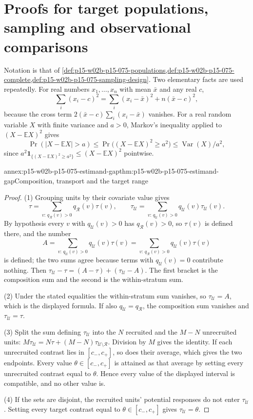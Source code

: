 \section{Proofs for target populations, sampling and observational comparisons}
\label{sec:annex-p15-w02b-p15-075}

Notation is that of
\cref{def:p15-w02b-p15-075-populations,def:p15-w02b-p15-075-complete,def:p15-w02b-p15-075-sampling-design}.
Two elementary facts are used repeatedly. For real numbers \(x_1,\ldots,x_n\)
with mean \(\bar x\) and any real \(c\),
\[
 \sum_i(x_i-c)^2=\sum_i(x_i-\bar x)^2+n(\bar x-c)^2, \tag{A}
\]
because the cross term \(2(\bar x-c)\sum_i(x_i-\bar x)\) vanishes. For a real
random variable \(X\) with finite variance and \(a>0\), Markov's inequality
applied to \((X-\mathbb EX)^2\) gives
\[
 \Pr(|X-\mathbb EX|>a)\leq\Pr\bigl((X-\mathbb EX)^2\geq a^2\bigr)
 \leq\operatorname{Var}(X)/a^2, \tag{B}
\]
since \(a^2\mathbf1_{\{(X-\mathbb EX)^2\geq a^2\}}\leq(X-\mathbb EX)^2\)
pointwise.

\begin{annexitem}{annex:p15-w02b-p15-075-estimand-gap}{thm:p15-w02b-p15-075-estimand-gap}{Composition, transport and the target range}
\begin{proof}
(1) Grouping units by their covariate value gives
\[
 \tau=\sum_{v:\,q_{\mathcal R}(v)>0}q_{\mathcal R}(v)\tau(v),\qquad
 \tau_{\mathcal U}=\sum_{v:\,q_{\mathcal U}(v)>0}q_{\mathcal U}(v)\tau_{\mathcal U}(v).
\]
By hypothesis every \(v\) with \(q_{\mathcal U}(v)>0\) has
\(q_{\mathcal R}(v)>0\), so \(\tau(v)\) is defined there, and the number
\[
 A=\sum_{v:\,q_{\mathcal U}(v)>0}q_{\mathcal U}(v)\tau(v)
  =\sum_{v:\,q_{\mathcal R}(v)>0}q_{\mathcal U}(v)\tau(v)
\]
is defined; the two sums agree because terms with \(q_{\mathcal U}(v)=0\)
contribute nothing. Then
\(\tau_{\mathcal U}-\tau=(A-\tau)+(\tau_{\mathcal U}-A)\). The first bracket
is the composition sum and the second is the within-stratum sum.

(2) Under the stated equalities the within-stratum sum vanishes, so
\(\tau_{\mathcal U}=A\), which is the displayed formula. If also
\(q_{\mathcal U}=q_{\mathcal R}\), the composition sum vanishes and
\(\tau_{\mathcal U}=\tau\).

(3) Split the sum defining \(\tau_{\mathcal U}\) into the \(N\) recruited and
the \(M-N\) unrecruited units:
\(M\tau_{\mathcal U}=N\tau+(M-N)\tau_{\mathcal U\setminus\mathcal R}\).
Division by \(M\) gives the identity. If each unrecruited contrast lies in
\([c_-,c_+]\), so does their average, which gives the two endpoints. Every
value \(\theta\in[c_-,c_+]\) is attained as that average by setting every
unrecruited contrast equal to \(\theta\). Hence every value of the displayed
interval is compatible, and no other value is.

(4) If the sets are disjoint, the recruited units' potential responses do not
enter \(\tau_{\mathcal U}\). Setting every target contrast equal to
\(\theta\in[c_-,c_+]\) gives \(\tau_{\mathcal U}=\theta\).
\end{proof}
\end{annexitem}

